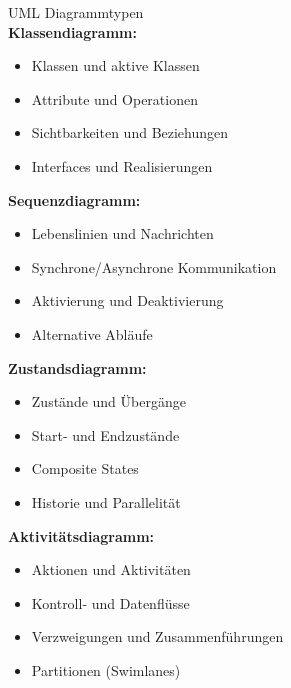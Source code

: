 \begin{concept}{UML Diagrammtypen}\\
\textbf{Klassendiagramm:}
\begin{itemize}
    \item Klassen und aktive Klassen
    \item Attribute und Operationen
    \item Sichtbarkeiten und Beziehungen
    \item Interfaces und Realisierungen
\end{itemize}

\textbf{Sequenzdiagramm:}
\begin{itemize}
    \item Lebenslinien und Nachrichten
    \item Synchrone/Asynchrone Kommunikation
    \item Aktivierung und Deaktivierung
    \item Alternative Abläufe
\end{itemize}

\textbf{Zustandsdiagramm:}
\begin{itemize}
    \item Zustände und Übergänge
    \item Start- und Endzustände
    \item Composite States
    \item Historie und Parallelität
\end{itemize}

\textbf{Aktivitätsdiagramm:}
\begin{itemize}
    \item Aktionen und Aktivitäten
    \item Kontroll- und Datenflüsse
    \item Verzweigungen und Zusammenführungen
    \item Partitionen (Swimlanes)
\end{itemize}
\end{concept}

